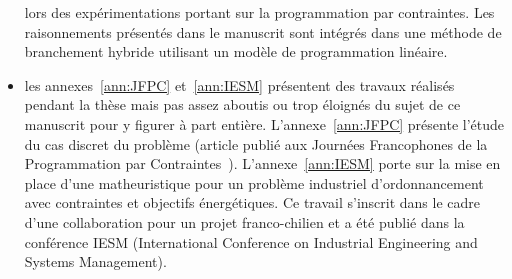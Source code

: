 \begin{itemize}
  lors des expérimentations portant sur la programmation par
  contraintes. Les raisonnements présentés dans le manuscrit sont
  intégrés dans une méthode de branchement hybride utilisant un modèle
  de programmation linéaire.  
\item les annexes~\ref{ann:JFPC} et~\ref{ann:IESM} présentent des
  travaux réalisés pendant la thèse mais pas assez aboutis ou trop
  éloignés du sujet de ce manuscrit pour y figurer à part entière.
  L'annexe~\ref{ann:JFPC} présente l'étude du cas discret du problème
  (article publié aux Journées Francophones de la Programmation par
  Contraintes~\cite{Nattaf_JFPC}). L'annexe~\ref{ann:IESM} porte sur
  la mise en place d'une matheuristique pour un problème industriel
  d'ordonnancement avec contraintes et objectifs énergétiques. Ce
  travail s'inscrit dans le cadre d'une collaboration pour un projet
  franco-chilien et a été publié dans la conférence IESM (International
  Conference on Industrial Engineering and Systems Management).
\end{itemize}










